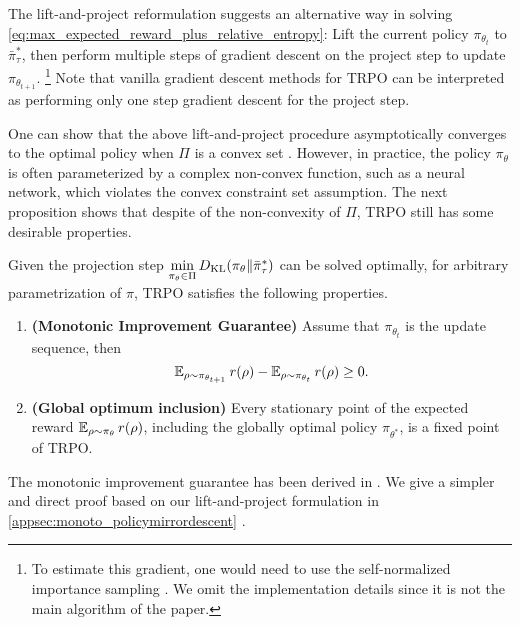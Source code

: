 \begin{remk}
The lift-and-project reformulation suggests an alternative way in solving \cref{eq:max_expected_reward_plus_relative_entropy}: Lift the current policy $\pi_{\theta_t}$ to $\bar{\pi}_\tau^*$, then perform multiple steps of gradient descent on the project step to update $\pi_{\theta_{t+1}}$. \footnote{To estimate this gradient, one would need to use the self-normalized importance sampling \cite{owen2013monte}. We omit the implementation details since it is not the main algorithm of the paper.}
Note that vanilla gradient descent methods for TRPO can be interpreted as performing only one step gradient descent for the project step.  
\end{remk}
One can show that the above lift-and-project procedure asymptotically converges to the optimal policy when $\Pi$ is a convex set \citep{nemirovskii1983problem,beck2003mirror}. 
However, in practice, the policy $\pi_\theta$ is often parameterized by a complex non-convex function, such as a neural network, which violates the convex constraint set assumption. 
The next proposition shows that despite of the non-convexity of $\Pi$, TRPO still has some desirable properties.
\begin{prop}
\label{prop:monoto_policymirrordescent}
Given the projection step $\min\limits_{\pi_\theta \in \Pi}{D_{\mathrm{KL}}( \pi_\theta \| \bar{\pi}_{\tau}^* )}$ can be solved optimally, for arbitrary parametrization of $\pi$, TRPO satisfies the following properties.
\begin{enumerate}
	\item {\bf (Monotonic Improvement Guarantee)} 
	Assume that $\pi_{\theta_{t}}$ is the update sequence, then 
	 \begin{equation*}
	\operatorname{\mathbb{E}}_{\rho \sim \pi_{\theta_{t+1}}}{r(\rho)} - \operatorname{\mathbb{E}}_{\rho \sim \pi_{\theta_{t}}}{  r(\rho)} \ge 0.
	\end{equation*}
	\item {\bf (Global optimum inclusion)} Every stationary point of the expected reward $\operatorname{\mathbb{E}}_{\rho \sim \pi_\theta}{  r(\rho)}$, including the globally optimal policy $\pi_{\theta^*}$,  is a fixed point of TRPO.
\end{enumerate}
\end{prop}

\begin{remk}
	The monotonic improvement guarantee has been derived in \citep{schulman2015trust}. We give a simpler and direct proof based on our lift-and-project formulation in \cref{appsec:monoto_policymirrordescent} .
\end{remk}


